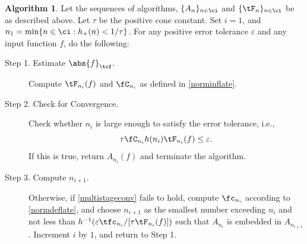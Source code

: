 \documentclass[]{elsarticle}
\theoremstyle{definition}
\newtheorem{algo}{Algorithm}
\theoremstyle{remark}
\newcommand{\Ftnorm}[1]{\abs{#1}_{\tcf}}
\begin{document}
\begin{algo} \label{multistagealgo}  Let the sequences of algorithms, $\{A_n\}_{n \in \ci}$ and  $\{\tF_n\}_{n \in \ci}$ be as described above.  Let $\tau$ be the positive cone constant. Set $i=1$, and $n_1 = \min\{ n \in \ci : h_+(n) < 1/\tau\}$. For any positive error tolerance $\varepsilon$ and any input function $f$, do the following:
\begin{description}

\item [Step 1. Estimate $\Ftnorm{f}$.] Compute $\tF_{n_i}(f)$ and $\fC_{n_i}$ as defined in \eqref{norminflate}.  

\item [Step 2. Check for Convergence.] Check whether $n_i$ is large enough to satisfy the error tolerance, i.e., 
\begin{equation} \label{multistageconv}
\tau \fC_{n_i} h(n_i)\tF_{n_i}(f) \le \varepsilon.
\end{equation}
If this is true, return $A_{n_i}(f)$ and terminate the algorithm.

\item[Step 3. Compute $n_{i+1}$.]  Otherwise, if \eqref{multistageconv} fails to hold, compute $\fc_{n_i}$ according to \eqref{normdeflate}, and choose $n_{i+1}$ as the smallest number exceeding $n_i$ and not less than $h^{-1}(\varepsilon \tfc_{n_i}/[\tau \tF_{n_i}(f)])$ such that $A_{n_{i}}$ is embedded in $A_{n_{i+1}}$. Increment $i$ by $1$, and return to Step 1.  

\end{description}  
\end{algo}
\end{document}
